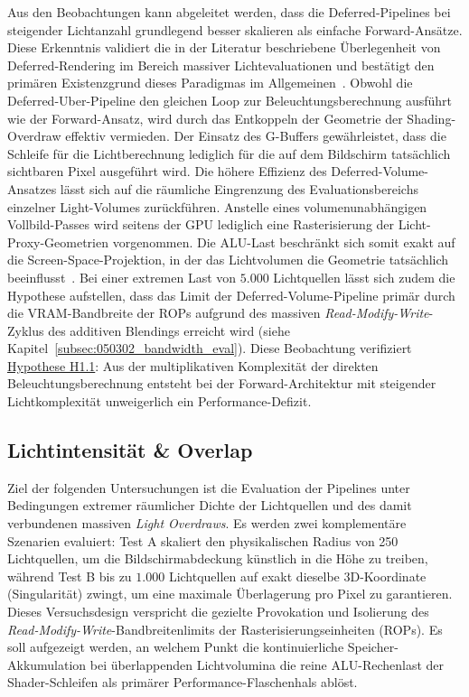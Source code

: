 Aus den Beobachtungen kann abgeleitet werden, dass die Deferred-Pipelines bei steigender Lichtanzahl grundlegend besser
skalieren als einfache Forward-Ansätze.
Diese Erkenntnis validiert die in der Literatur beschriebene Überlegenheit von Deferred-Rendering im Bereich massiver
Lichtevaluationen und bestätigt den primären Existenzgrund dieses Paradigmas im
Allgemeinen~\parencite[vgl.][S.~1]{Thaler2011DeferredRendering}.
Obwohl die Deferred-Uber-Pipeline den gleichen Loop zur Beleuchtungsberechnung ausführt wie der Forward-Ansatz, wird
durch das Entkoppeln der Geometrie der Shading-Overdraw effektiv vermieden.
Der Einsatz des \ac{G-Buffer}s gewährleistet, dass die Schleife für die Lichtberechnung lediglich für die auf dem
Bildschirm tatsächlich sichtbaren Pixel ausgeführt wird.
Die höhere Effizienz des Deferred-Volume-Ansatzes lässt sich auf die räumliche Eingrenzung des
Evaluationsbereichs einzelner Light-Volumes zurückführen.
Anstelle eines volumenunabhängigen Vollbild-Passes wird seitens der \ac{GPU} lediglich eine Rasterisierung der
Licht-Proxy-Geometrien vorgenommen.
Die \ac{ALU}-Last beschränkt sich somit exakt auf die Screen-Space-Projektion, in der das Lichtvolumen die Geometrie
tatsächlich beeinflusst~\parencite[vgl.][S.~886]{akenine-mollerRealtimeRendering2019}.
Bei einer extremen Last von $5.000$ Lichtquellen lässt sich zudem die Hypothese aufstellen, dass das Limit der
Deferred-Volume-Pipeline primär durch die \ac{VRAM}-Bandbreite der \ac{ROP}s aufgrund des massiven
\textit{Read-Modify-Write}-Zyklus des additiven Blendings erreicht wird
(siehe Kapitel~\ref{subsec:050302_bandwidth_eval}).
Diese Beobachtung verifiziert \hyperlink{hyp:H1.1}{Hypothese H1.1}: Aus der multiplikativen Komplexität der
direkten Beleuchtungsberechnung entsteht bei der Forward-Architektur mit steigender Lichtkomplexität unweigerlich ein
Performance-Defizit.

\subsection{{Lichtintensität \& Overlap}}
\label{subsec:050402_light_intensity_and_overlap_eval}

Ziel der folgenden Untersuchungen ist die Evaluation der Pipelines unter Bedingungen extremer räumlicher Dichte der
Lichtquellen und des damit verbundenen massiven \textit{Light Overdraws}.
Es werden zwei komplementäre Szenarien evaluiert: Test A skaliert den physikalischen Radius von 250 Lichtquellen, um die
Bildschirmabdeckung künstlich in die Höhe zu treiben, während Test B bis zu $1.000$ Lichtquellen auf exakt dieselbe
3D-Koordinate (Singularität) zwingt, um eine maximale Überlagerung pro Pixel zu garantieren.
Dieses Versuchsdesign verspricht die gezielte Provokation und Isolierung des
\textit{Read-Modify-Write}-Bandbreitenlimits der Rasterisierungseinheiten (\acp{ROP}).
Es soll aufgezeigt werden, an welchem Punkt die kontinuierliche Speicher-Akkumulation bei überlappenden Lichtvolumina
die reine \ac{ALU}-Rechenlast der Shader-Schleifen als primärer Performance-Flaschenhals ablöst.

